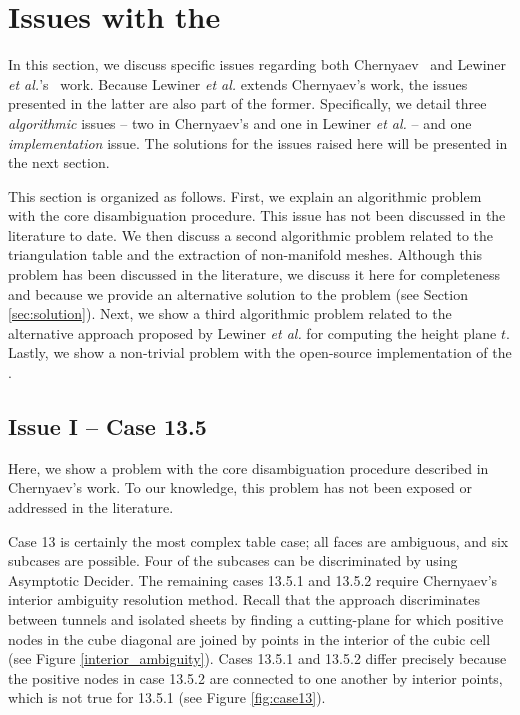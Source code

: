 \section{Issues with the \mc{}}
\label{erros_cause:chernyaev}

In this section, we discuss specific issues regarding both Chernyaev~\cite{Chernyaev95marchingcubes} and Lewiner \emph{et al.}'s~\cite{Lewiner:2003} work. Because Lewiner \emph{et al.} extends Chernyaev's work, the issues presented in the latter are also part of the former. Specifically, we detail three \emph{algorithmic} issues -- two in Chernyaev's \mc{} and one in Lewiner \emph{et al.}  --  and one \emph{implementation} issue. The solutions for the issues raised here will be presented in the next section.

This section is organized as follows. First, we explain an algorithmic problem with the \mc{} core disambiguation procedure. This issue has not been discussed in the literature to date. We then discuss a second algorithmic problem related to the triangulation table and the extraction of non-manifold meshes. Although this problem has been discussed in the literature, we discuss it here for completeness and because we provide an alternative  solution to the problem (see Section \ref{sec:solution}). Next, we show a third algorithmic problem related to the alternative approach proposed by Lewiner \emph{et al.} for computing the height plane $t$. Lastly, we show a non-trivial problem with the open-source implementation of the \mc{}. 

\subsection{Issue I -- Case 13.5}
\label{sec:problem-case-13}

Here, we show a problem with the core disambiguation procedure described in Chernyaev's work. To our knowledge, this problem has not been exposed or addressed in the literature.

Case 13 is certainly the most complex table case; all faces are ambiguous, and six subcases are possible. Four of the subcases can be discriminated by using Asymptotic Decider. The remaining cases 13.5.1 and 13.5.2 require Chernyaev's \mc{} interior ambiguity resolution method.
%
Recall that the \mc{} approach discriminates between tunnels and isolated sheets by finding a cutting-plane for which positive nodes in the cube diagonal are joined by points in the interior of the cubic cell (see Figure \ref{interior_ambiguity}). 
Cases 13.5.1 and 13.5.2 differ precisely because the positive nodes in case 13.5.2 are connected to one another by interior points, which is not true for 13.5.1 (see Figure \ref{fig:case13}).

